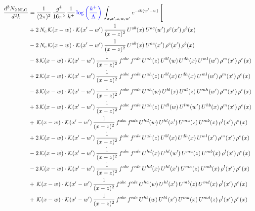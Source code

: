 \documentclass[9pt]{article}
\numberwithin{equation}{section}
\begin{document}
\begin{align}
\frac{d^{3}N_{2\,\mathrm{NLO}}}{d^{3}k} & = \frac{1}{(2\pi)^{3}}\,\frac{g^{4}}{16\pi^{5}}\,\frac{1}{k^{+}}\,{\color{blue}\log{\left(\frac{k^{+}}{\Lambda}\right)}}\,\int_{x,x',z,w,w'}e^{-ik(w'-w)}\,\Bigg[
\notag\\ &+2\,N_{c}\,\mathcal{K}(x-w)\cdot\mathcal{K}(x'-w')\,\frac{1}{(x-z)^{2}}\,U^{ab}(x)\,U^{ac}(w')\,\rho^{c}(x')\,\rho^{b}(x)\notag\\
&-2\,N_{c}\,\mathcal{K}(x-w)\cdot\mathcal{K}(x'-w')\,\frac{1}{(x-z)^{2}}\,U^{ab}(x)\,U^{ac}(x')\,\rho^{c}(x')\,\rho^{b}(x)\notag\\
&-3\,\mathcal{K}(x-w)\cdot\mathcal{K}(x'-w')\,\frac{1}{(x-z)^{2}}\,f^{abc}\,f^{cde}\,U^{ah}(z)\,U^{bl}(w)\,U^{dh}(x)\,U^{ml}(w')\,\rho^{m}(x')\,\rho^{e}(x)\notag\\
&+2\,\mathcal{K}(x-w)\cdot\mathcal{K}(x'-w')\,\frac{1}{(x-z)^{2}}\,f^{abc}\,f^{cde}\,U^{ah}(z)\,U^{bl}(x)\,U^{dh}(x)\,U^{ml}(w')\,\rho^{m}(x')\,\rho^{e}(x)\notag\\
&-3\,\mathcal{K}(x-w)\cdot\mathcal{K}(x'-w')\,\frac{1}{(x-z)^{2}}\,f^{abc}\,f^{cde}\,U^{ah}(w)\,U^{bl}(x)\,U^{dl}(z)\,U^{mh}(w')\,\rho^{m}(x')\,\rho^{e}(x)\notag\\
&+3\,\mathcal{K}(x-w)\cdot\mathcal{K}(x'-w')\,\frac{1}{(x-z)^{2}}\,f^{abc}\,f^{cde}\,U^{ah}(z)\,U^{dl}(w)\,U^{lm}(w')\,U^{hb}(x)\,\rho^{m}(x')\,\rho^{e}(x)\notag\\
&+\,\mathcal{K}(x-w)\cdot\mathcal{K}(x'-w')\,\frac{1}{(x-z)^{2}}\,f^{abc}\,f^{cde}\,U^{hd}(w)\,U^{hl}(x')\,U^{ma}(z)\,U^{mb}(x)\,\rho^{l}(x')\,\rho^{e}(x)\notag\\
&+2\,\mathcal{K}(x-w)\cdot\mathcal{K}(x'-w')\,\frac{1}{(x-z)^{2}}\,f^{abc}\,f^{cde}\,U^{ah}(z)\,U^{bl}(x)\,U^{dh}(x)\,U^{ml}(x')\,\rho^{m}(x')\,\rho^{e}(x)\notag\\
&-2\,\mathcal{K}(x-w)\cdot\mathcal{K}(x'-w')\,\frac{1}{(x-z)^{2}}\,f^{abc}\,f^{cde}\,U^{hd}(x)\,U^{hl}(w')\,U^{ma}(z)\,U^{mb}(x)\,\rho^{l}(x')\,\rho^{e}(x)\notag\\
&-2\,\mathcal{K}(x-w)\cdot\mathcal{K}(x'-w')\,\frac{1}{(x-z)^{2}}\,f^{abc}\,f^{cde}\,U^{hd}(x)\,U^{hl}(x')\,U^{ma}(z)\,U^{mb}(x)\,\rho^{l}(x')\,\rho^{e}(x)\notag\\
&+\,\mathcal{K}(x-w)\cdot\mathcal{K}(x'-w')\,\frac{1}{(x-z)^{2}}\,f^{abc}\,f^{cde}\,U^{ha}(w)\,U^{hl}(x')\,U^{mb}(z)\,U^{md}(x)\,\rho^{l}(x')\,\rho^{e}(x)\notag\\
&+\,\mathcal{K}(x-w)\cdot\mathcal{K}(x'-w')\,\frac{1}{(x-z)^{2}}\,f^{abc}\,f^{cde}\,U^{hb}(w)\,U^{hl}(x')\,U^{ma}(x)\,U^{md}(z)\,\rho^{l}(x')\,\rho^{e}(x)\notag\\

\end{align}
\end{document}
